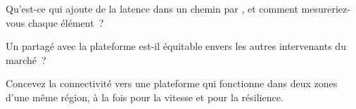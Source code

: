 \begin{interviewq}\label{iq:nw:private-connectivity-to-crypto-venues:4}
Qu'est-ce qui ajoute de la latence dans un chemin par , et comment mesureriez-vous chaque élément~?
\end{interviewq}

\begin{interviewq}\label{iq:nw:private-connectivity-to-crypto-venues:5}
Un  partagé avec la plateforme est-il équitable envers les autres intervenants du marché~?
\end{interviewq}

\begin{interviewq}\label{iq:nw:private-connectivity-to-crypto-venues:6}
Concevez la connectivité vers une plateforme qui fonctionne dans deux zones d'une même région, à la fois pour la vitesse et pour la résilience.
\end{interviewq}
